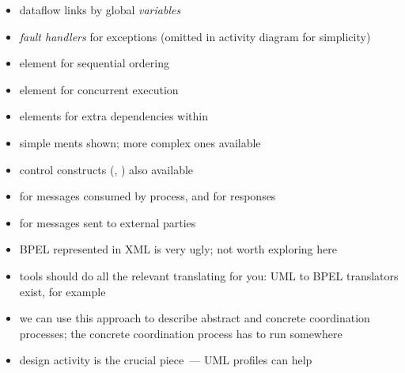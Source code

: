 \documentclass{sepslide-soa-faked} %
\begin{document}
\begin{slide}
\begin{itemize}
\item dataflow links by global \emph{variables}
\item \emph{fault handlers} for exceptions (omitted in activity diagram for
  simplicity) 
\item {} element for sequential ordering
\item {} element for concurrent execution
\item {} elements for extra dependencies within 
\item simple ments shown; more complex ones available
\item control constructs (, ) also available
\item {} for messages consumed by process, and
   for responses
\item {} for messages sent to external parties
\end{itemize}
\end{slide}

\begin{slide}
\begin{itemize}
\item BPEL represented in XML is very ugly; not worth exploring here
\item tools should do all the relevant translating for you: UML to
BPEL translators exist, for example
\item we can use this approach to describe abstract and concrete
coordination processes;  the concrete coordination process has to run
somewhere
\item design activity is the crucial piece~--- UML profiles
can help
\end{itemize}
\end{slide}

\begin{slide}
  \Listofslides
\end{slide}

\begin{slide}
  \Timetable
\end{slide}
\end{document}
